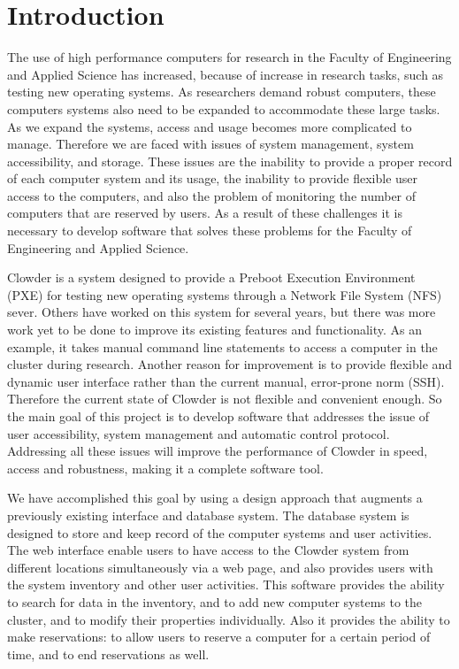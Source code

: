 \chapter{Introduction}
\label{chap:intro}

The use of high performance computers for  research in the Faculty of Engineering  and Applied Science has increased, because of increase in research tasks, such as testing new operating systems. As researchers demand robust computers, these computers systems also need to be expanded to accommodate these large tasks. As we expand the systems, access and usage  becomes more complicated to manage. Therefore we are faced with issues of system management, system accessibility, and storage. These issues are the inability to provide  a proper record of each computer system and its usage, the inability to provide flexible user access to the computers, and also the problem of monitoring the number of computers that are reserved by users. As a result of these challenges it is necessary to develop software that solves these problems for the Faculty of Engineering and Applied Science. 


Clowder is a system designed to provide a Preboot Execution Environment (PXE) for testing new operating systems through a Network File System (NFS) sever. Others have worked on this system for several years, but there was more work yet to be done to improve its existing features and functionality. As an example, it takes manual command line statements to access  a computer in the cluster during research. Another reason for improvement is to provide flexible and dynamic user interface rather than the current manual, error-prone norm (SSH). Therefore the current state of Clowder is not flexible and convenient enough. So the main goal of this project is to develop software that addresses the issue of user accessibility, system management and automatic control protocol. Addressing all these issues will improve the performance of Clowder in speed, access and robustness, making it a complete software tool. 
	
	
We have accomplished this goal by using a design approach that augments a previously existing interface and database system. The database system is designed to store and keep record of the computer systems and user activities. The web interface enable users to have access to the Clowder system from different locations simultaneously via a web page, and also provides users with the system inventory and other user activities. This  software provides the ability to search for data in the inventory, and to add new computer systems to the cluster, and to modify their properties individually. Also it provides the ability to make reservations: to allow users to reserve a computer for a certain period of time, and to end reservations as well.    
	

